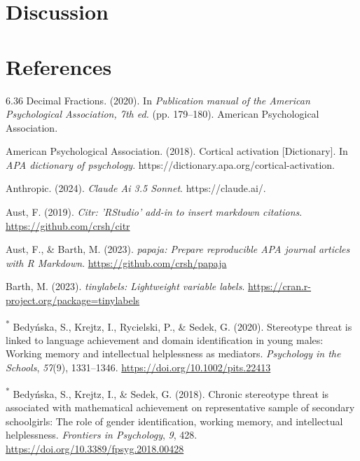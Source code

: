 \documentclass[
  stu, a4paper,floatsintext]{apa7}
\newlength{\cslhangindent}
\newenvironment{CSLReferences}[2] %
 {\begin{list}{}{%
  \setlength{\itemindent}{0pt}
  \setlength{\leftmargin}{0pt}
  \setlength{\parsep}{0pt}
  \ifodd #1
   \setlength{\leftmargin}{\cslhangindent}
   \setlength{\itemindent}{-1\cslhangindent}
  \fi
  \setlength{\itemsep}{#2\baselineskip}}}
 {\end{list}}
\begin{document}
\section{Discussion}\label{discussion}

\newpage

\section{References}\label{references}

\label{refs}
\begin{CSLReferences}{1}{0}
6.36 {Decimal Fractions}. (2020). In \emph{Publication manual of the {American Psychological Association}, 7th ed.} (pp. 179--180). American Psychological Association.

American Psychological Association. (2018). Cortical activation {[}Dictionary{]}. In \emph{APA dictionary of psychology}. https://dictionary.apa.org/cortical-activation.

Anthropic. (2024). \emph{Claude {Ai} 3.5 {Sonnet}}. https://claude.ai/.

Aust, F. (2019). \emph{Citr: 'RStudio' add-in to insert markdown citations}. \url{https://github.com/crsh/citr}

Aust, F., \& Barth, M. (2023). \emph{{papaja}: {Prepare} reproducible {APA} journal articles with {R Markdown}}. \url{https://github.com/crsh/papaja}

Barth, M. (2023). \emph{{tinylabels}: Lightweight variable labels}. \url{https://cran.r-project.org/package=tinylabels}

\textsuperscript{*} Bedyńska, S., Krejtz, I., Rycielski, P., \& Sedek, G. (2020). Stereotype threat is linked to language achievement and domain identification in young males: {Working} memory and intellectual helplessness as mediators. \emph{Psychology in the Schools}, \emph{57}(9), 1331--1346. \url{https://doi.org/10.1002/pits.22413}

\textsuperscript{*} Bedyńska, S., Krejtz, I., \& Sedek, G. (2018). Chronic stereotype threat is associated with mathematical achievement on representative sample of secondary schoolgirls: {The} role of gender identification, working memory, and intellectual helplessness. \emph{Frontiers in Psychology}, \emph{9}, 428. \url{https://doi.org/10.3389/fpsyg.2018.00428}


\end{CSLReferences}
\end{document}
